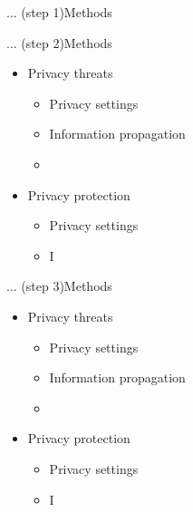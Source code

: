 \begin{frame}{... (step 1)}{Methods}

\end{frame}

\begin{frame}{... (step 2)}{Methods}
	\begin{itemize}
		\item Privacy threats
			\begin{itemize}
				\item Privacy settings
				\item Information propagation
				\item 
			\end{itemize}
		\item Privacy protection
			\begin{itemize}
				\item Privacy settings
				\item I
			\end{itemize}
	\end{itemize}
\end{frame}

\begin{frame}{... (step 3)}{Methods}
	\begin{itemize}
		\item Privacy threats
			\begin{itemize}
				\item Privacy settings
				\item Information propagation
				\item 
			\end{itemize}
		\item Privacy protection
			\begin{itemize}
				\item Privacy settings
				\item I
			\end{itemize}
	\end{itemize}
\end{frame}

